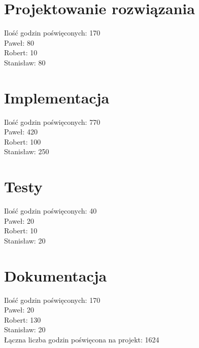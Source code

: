 \documentclass[a4paper,11pt]{report}
\begin{document}
\section{Projektowanie rozwiązania}
Ilość godzin poświęconych: 170\\
Paweł: 80\\
Robert: 10\\
Stanisław: 80\\

\section{Implementacja}
Ilość godzin poświęconych: 770\\
Paweł: 420\\
Robert: 100\\
Stanisław: 250\\

\section{Testy}
Ilość godzin poświęconych: 40\\
Paweł: 20\\
Robert: 10\\
Stanisław: 20\\

\section{Dokumentacja}
Ilość godzin poświęconych: 170\\
Paweł: 20\\
Robert: 130\\
Stanisław: 20\\

Łączna liczba godzin poświęcona na projekt: 1624\\
\end{document}
